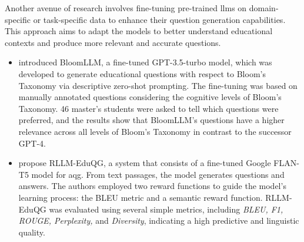 \begin{itemize}
\end{itemize}

 Another avenue of research involves fine-tuning pre-trained \ac{llms} on domain-specific or task-specific data to enhance their question generation capabilities. This approach aims to adapt the models to better understand educational contexts and produce more relevant and accurate questions.
\begin{itemize}
    \item \cite{duong-trung_bloomllm_2024} introduced BloomLLM, a fine-tuned GPT-3.5-turbo model, which was developed to generate educational questions with respect to Bloom's Taxonomy via descriptive zero-shot prompting. The fine-tuning was based on manually annotated questions considering the cognitive levels of Bloom's Taxonomy. 46 master's students were asked to tell which questions were preferred, and the results show that BloomLLM's questions have a higher relevance across all levels of Bloom's Taxonomy in contrast to the successor GPT-4.
    \item \cite{lamsiyah_fine-tuning_2024} propose RLLM-EduQG, a system that consists of a fine-tuned Google FLAN-T5 model for \ac{aqg}. From text passages, the model generates questions and answers. The authors employed two reward functions to guide the model's learning process: the BLEU metric and a semantic reward function. RLLM-EduQG was evaluated using several simple metrics, including \textit{BLEU, F1, ROUGE, Perplexity,} and \textit{Diversity}, indicating a high predictive and linguistic quality.
\end{itemize}

